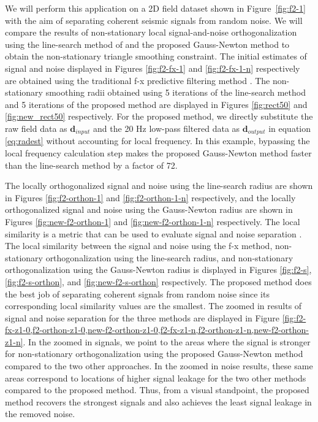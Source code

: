 We will perform this application on a 2D field dataset shown in Figure~\ref{fig:f2-1} with the aim of separating coherent seismic signals from random noise. We will compare the results of non-stationary local signal-and-noise orthogonalization using the line-search method of \cite{greerfomel2018} and the proposed Gauss-Newton method to obtain the non-stationary triangle smoothing constraint. The initial estimates of signal and noise displayed in Figures \ref{fig:f2-fx-1} and \ref{fig:f2-fx-1-n} respectively are obtained using the traditional f-x predictive filtering method \cite[]{canales1984}. The non-stationary smoothing radii obtained using 5 iterations of the line-search method and 5 iterations of the proposed method are displayed in Figures \ref{fig:rect50} and \ref{fig:new_rect50} respectively. For the proposed method, we directly substitute the raw field data as $\mathbf{d}_{input}$ and the 20 Hz low-pass filtered data as $\mathbf{d}_{output}$ in equation \ref{eq:radest} without accounting for local frequency. In this example, bypassing the local frequency calculation step makes the proposed Gauss-Newton method faster than the line-search method by a factor of 72.



The locally orthogonalized signal and noise using the line-search radius are shown in Figures \ref{fig:f2-orthon-1} and \ref{fig:f2-orthon-1-n} respectively, and the locally orthogonalized signal and noise using the Gauss-Newton radius are shown in Figures \ref{fig:new-f2-orthon-1} and \ref{fig:new-f2-orthon-1-n} respectively. 
The local similarity is a metric that can be used to evaluate signal and noise separation \cite[]{chenfomel2015}.
The local similarity between the signal and noise using the f-x method, non-stationary orthogonalization using the line-search radius, and non-stationary orthogonalization using the Gauss-Newton radius is displayed in Figures \ref{fig:f2-s}, \ref{fig:f2-s-orthon}, and \ref{fig:new-f2-s-orthon} respectively. 
The proposed method does the best job of separating coherent signals from random noise since its corresponding local similarity values are the smallest. 
The zoomed in results of signal and noise separation for the three methods are displayed in Figure \ref{fig:f2-fx-z1-0,f2-orthon-z1-0,new-f2-orthon-z1-0,f2-fx-z1-n,f2-orthon-z1-n,new-f2-orthon-z1-n}.
In the zoomed in signals, we point to the areas where the signal is stronger for non-stationary orthogonalization using the proposed Gauss-Newton method compared to the two other approaches. 
In the zoomed in noise results, these same areas correspond to locations of higher signal leakage for the two other methods compared to the proposed method. 
Thus, from a visual standpoint, the proposed method recovers the strongest signals and also achieves the least signal leakage in the removed noise. 

